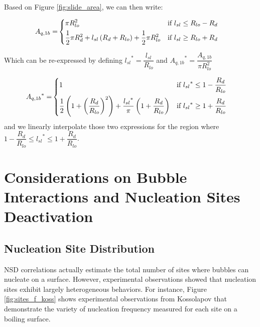 \npar

Based on Figure \ref{fig:slide_area}, we can then write:

\begin{align}
A_{q,1b} = &
\begin{dcases}
\pi R_{lo}^{2} & \text{if } l_{sl}\leq R_{lo}-R_{d} \\
%
\frac{1}{2}\pi R_{d}^{2} + l_{sl}\parth{R_{d}+R_{lo}} + \frac{1}{2}\pi R_{lo}^{2} & \text{if } l_{sl} \geq R_{lo}+R_{d}
%
\end{dcases}
\end{align}

Which can be re-expressed by defining ${l_{sl}}^{*}=\dfrac{l_{sl}}{R_{lo}}$ and ${A_{q,1b}}^{*}=\dfrac{A_{q,1b}}{\pi R_{lo}^{2}}$

\begin{align}
{A_{q,1b}}^{*} = &
\begin{dcases}
1 & \text{if } {l_{sl}}^{*}\leq 1- \frac{R_{d}}{R_{lo}} \\
%
\frac{1}{2}\parth{1+\parth{\frac{R_{d}}{R_{lo}}}^{2} } + \frac{{l_{sl}}^{*}}{\pi}\parth{1+\frac{R_{d}}{R_{lo}}} & \text{if } {l_{sl}}^{*} \geq 1 + \frac{R_{d}}{R_{lo}}
\end{dcases}
\end{align}
and we linearly interpolate those two expressions for the region where $1-\dfrac{R_{d}}{R_{lo}}\leq {l_{sl}}^{*} \leq 1+\dfrac{R_{d}}{R_{lo}}$.





\section{Considerations on Bubble Interactions and Nucleation Sites Deactivation}

\subsection{Nucleation Site Distribution}

NSD correlations actually estimate the total number of sites where bubbles can nucleate on a surface. However, experimental observations showed that nucleation sites exhibit largely heterogeneous behaviors. For instance, Figure \ref{fig:sites_f_koss} shows experimental observations from Kossolapov \cite{kossolapov_experimental_2021} that demonstrate the variety of nucleation frequency measured for each site on a boiling surface.

